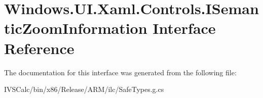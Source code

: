\hypertarget{interface_windows_1_1_u_i_1_1_xaml_1_1_controls_1_1_i_semantic_zoom_information}{}\section{Windows.\+U\+I.\+Xaml.\+Controls.\+I\+Semantic\+Zoom\+Information Interface Reference}
\label{interface_windows_1_1_u_i_1_1_xaml_1_1_controls_1_1_i_semantic_zoom_information}


The documentation for this interface was generated from the following file\+:\begin{DoxyCompactItemize}
\item 
I\+V\+S\+Calc/bin/x86/\+Release/\+A\+R\+M/ilc/Safe\+Types.\+g.\+cs\end{DoxyCompactItemize}
